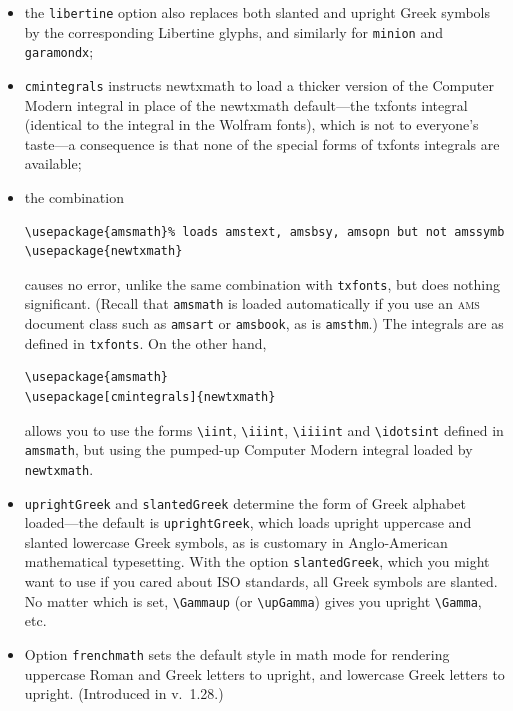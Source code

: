 \documentclass[11pt]{article}
\theoremstyle{oldplain}
\theoremstyle{plain}
\begin{document}
\begin{itemize}
\begin{verbatim}
\usepackage[osf]{erewhon} %extension of Utopia
\usepackage[varqu,varl]{inconsolata} % sans typewriter
\usepackage[scaled=.95]{cabin} % sans serif
\usepackage[utopia,bigdelims,vvarbb]{newtxmath}
\end{verbatim}
\item the {\tt libertine} option also replaces both slanted and upright Greek  symbols by the corresponding Libertine glyphs, and similarly for {\tt minion} and {\tt garamondx};
\item
{\tt cmintegrals} instructs \textsf{newtxmath} to load a thicker version of the Computer Modern integral in place of the \textsf{newtxmath} default---the txfonts integral (identical to the integral in the Wolfram fonts), which is not to everyone's taste---a consequence is that none of the special forms of \textsf{txfonts} integrals are available;
\item the combination
\begin{verbatim}
\usepackage{amsmath}% loads amstext, amsbsy, amsopn but not amssymb
\usepackage{newtxmath}
\end{verbatim}
causes no error, unlike the same combination with {\tt txfonts}, but does nothing significant. (Recall that {\tt amsmath} is loaded automatically if you use an \textsc{ams} document class such as {\tt amsart} or {\tt amsbook}, as is {\tt amsthm}.) The integrals are as defined in {\tt txfonts}. On the other hand,
\begin{verbatim}
\usepackage{amsmath}
\usepackage[cmintegrals]{newtxmath}
\end{verbatim}
allows you to use the forms \verb|\iint|, \verb|\iiint|, \verb|\iiiint| and \verb|\idotsint| defined in {\tt amsmath}, but using the pumped-up Computer Modern integral loaded by {\tt newtxmath}. 
\item {\tt uprightGreek} and {\tt slantedGreek} determine the form of Greek alphabet loaded---the default is {\tt uprightGreek}, which loads upright uppercase and slanted lowercase Greek symbols, as is customary in Anglo-American mathematical typesetting. With the option {\tt slantedGreek}, which you might want to use if you cared about ISO standards, all Greek symbols are slanted. No matter which is set, \verb|\Gammaup| (or \verb|\upGamma|) gives you upright \verb|\Gamma|, etc.
\item Option {\tt frenchmath} sets the default style in math mode for rendering uppercase Roman and Greek letters to upright, and lowercase Greek letters to upright. (Introduced in v.\ 1.28.)

\end{itemize}
\end{document}
